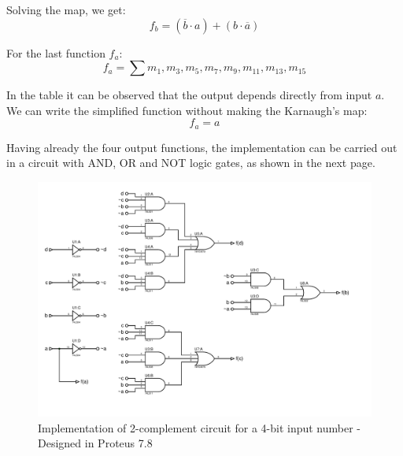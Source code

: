         Solving the map, we get:
        \[
            \boxed{f_b=(\overline{b} \cdot a)+(b \cdot \overline{a})}    
        \]\par
        For the last function $f_a$:
        \[
            f_{a}=\sum{m_1,m_3,m_5,m_7,m_9,m_{11},m_{13},m_{15}}    
        \]\par
        In the table it can be observed that the output depends 
        directly from input $a$. We can write the simplified 
        function without making the Karnaugh's map:
        \[
            \boxed{f_a=a}    
        \]
        \par
        Having already the four output functions, the implementation
        can be carried out in a circuit with AND, OR and NOT logic gates,
        as shown in the next page.
        \newpage
        \begin{figure}[H]
            \begin{centering}
            \includegraphics[width=1\textwidth]{ImplementacionEj4}
            \par\end{centering}
            \caption{Implementation of 2-complement circuit for a 4-bit input number - Designed in Proteus 7.8}
        \end{figure}
        
